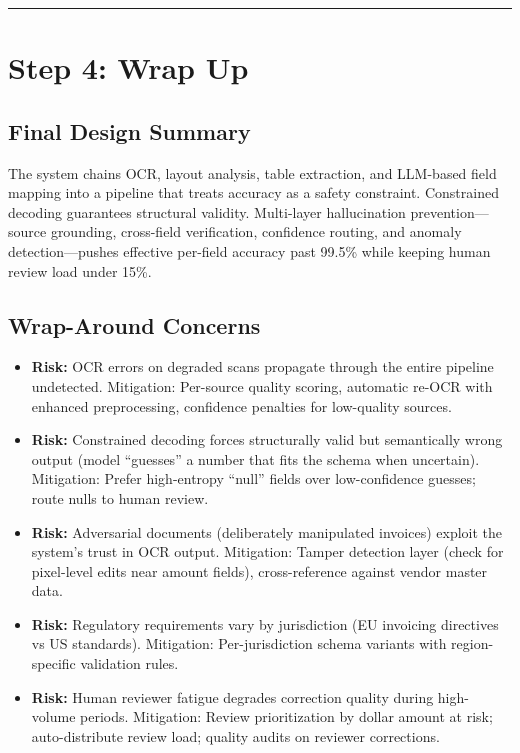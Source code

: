 \bigskip\hrule\bigskip

\section*{Step 4: Wrap Up}

\subsection*{Final Design Summary}

The system chains OCR, layout analysis, table extraction, and LLM-based field mapping into a pipeline that treats accuracy as a safety constraint. Constrained decoding guarantees structural validity. Multi-layer hallucination prevention---source grounding, cross-field verification, confidence routing, and anomaly detection---pushes effective per-field accuracy past 99.5\% while keeping human review load under 15\%.

\subsection*{Wrap-Around Concerns}

\begin{itemize}
  \item \textbf{Risk:} OCR errors on degraded scans propagate through the entire pipeline undetected. Mitigation: Per-source quality scoring, automatic re-OCR with enhanced preprocessing, confidence penalties for low-quality sources.
  \item \textbf{Risk:} Constrained decoding forces structurally valid but semantically wrong output (model ``guesses'' a number that fits the schema when uncertain). Mitigation: Prefer high-entropy ``null'' fields over low-confidence guesses; route nulls to human review.
  \item \textbf{Risk:} Adversarial documents (deliberately manipulated invoices) exploit the system's trust in OCR output. Mitigation: Tamper detection layer (check for pixel-level edits near amount fields), cross-reference against vendor master data.
  \item \textbf{Risk:} Regulatory requirements vary by jurisdiction (EU invoicing directives vs US standards). Mitigation: Per-jurisdiction schema variants with region-specific validation rules.
  \item \textbf{Risk:} Human reviewer fatigue degrades correction quality during high-volume periods. Mitigation: Review prioritization by dollar amount at risk; auto-distribute review load; quality audits on reviewer corrections.
\end{itemize}

